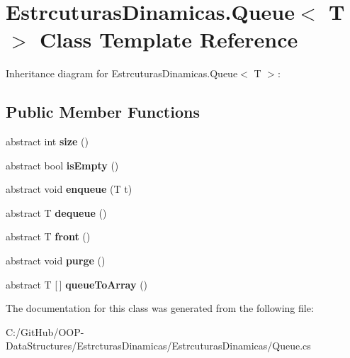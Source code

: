 \hypertarget{class_estrcuturas_dinamicas_1_1_queue}{}\section{Estrcuturas\+Dinamicas.\+Queue$<$ T $>$ Class Template Reference}
\label{class_estrcuturas_dinamicas_1_1_queue}


Inheritance diagram for Estrcuturas\+Dinamicas.\+Queue$<$ T $>$\+:
\subsection*{Public Member Functions}
\begin{DoxyCompactItemize}
\item 
\mbox{\label{class_estrcuturas_dinamicas_1_1_queue_a29404de883d99d3f90db573181892efc}} 
abstract int {\bfseries size} ()
\item 
\mbox{\label{class_estrcuturas_dinamicas_1_1_queue_a65fd96464d5cbc47f4e5b9fafe771439}} 
abstract bool {\bfseries is\+Empty} ()
\item 
\mbox{\label{class_estrcuturas_dinamicas_1_1_queue_a2f90cab8f6047bc35a4df8e1b4ffb084}} 
abstract void {\bfseries enqueue} (T t)
\item 
\mbox{\label{class_estrcuturas_dinamicas_1_1_queue_aad28514a9e86b171a554c46ecda2f82d}} 
abstract T {\bfseries dequeue} ()
\item 
\mbox{\label{class_estrcuturas_dinamicas_1_1_queue_a7eb87ece98a9cdc25ab8adf671f23eec}} 
abstract T {\bfseries front} ()
\item 
\mbox{\label{class_estrcuturas_dinamicas_1_1_queue_a42673181d5230fa7cddc30c9b3372b13}} 
abstract void {\bfseries purge} ()
\item 
\mbox{\label{class_estrcuturas_dinamicas_1_1_queue_a5aeb3c6425228f79993ae5a6117f6d4b}} 
abstract T \mbox{[}$\,$\mbox{]} {\bfseries queue\+To\+Array} ()
\end{DoxyCompactItemize}


The documentation for this class was generated from the following file\+:\begin{DoxyCompactItemize}
\item 
C\+:/\+Git\+Hub/\+O\+O\+P-\/\+Data\+Structures/\+Estrcturas\+Dinamicas/\+Estrcuturas\+Dinamicas/Queue.\+cs\end{DoxyCompactItemize}
